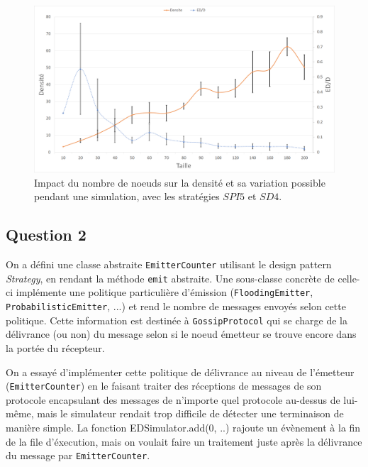\documentclass[a4paper]{article}
\begin{document}
\begin{figure}[H]
\begin{minipage}{\textwidth}
  \centering
    \includegraphics[width=\textwidth]{images/ex2.png}
    \caption{Impact du nombre de noeuds sur la densité et sa variation possible
      pendant une simulation, avec les stratégies $SPI5$ et $SD4$.}
\end{minipage}
\end{figure}

\subsection{Question 2}
On a défini une classe abstraite \texttt{EmitterCounter} utilisant le
design pattern \textsl{Strategy}, en rendant la méthode \texttt{emit}
abstraite. Une sous-classe concrète de celle-ci implémente une politique particulière d'émission
(\texttt{FloodingEmitter}, \texttt{ProbabilisticEmitter}, ...) et rend
le nombre de messages envoyés selon cette politique.
Cette information est destinée à \texttt{GossipProtocol} qui se charge
de la délivrance (ou non) du message selon si le noeud émetteur se
trouve encore dans la portée du récepteur.

On a essayé d'implémenter
cette politique de délivrance au niveau de l'émetteur
(\texttt{EmitterCounter}) en le faisant traiter des réceptions de
messages de son protocole encapsulant des messages de n'importe quel
protocole au-dessus de lui-même, mais le simulateur rendait trop difficile de détecter
une terminaison de manière simple. La fonction EDSimulator.add(0, ..)
rajoute un évènement à la fin de la file d'éxecution, mais on voulait
faire un traitement juste après la délivrance du message par \texttt{EmitterCounter}.


\pagebreak
\end{document}

